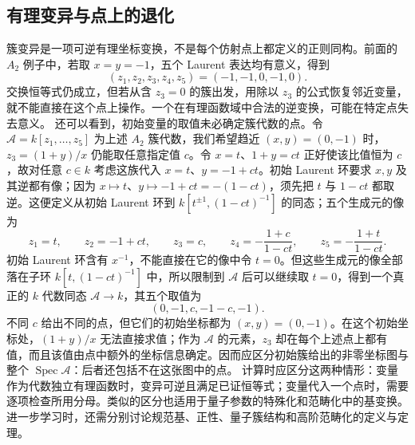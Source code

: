 \subsection{有理变异与点上的退化}
\label{b5:subsec:B04:02}

簇变异是一项可逆有理坐标变换，不是每个仿射点上都定义的正则同构。前面的 \(A_2\) 例子中，若取 \(x=y=-1\)，五个 Laurent 表达均有意义，得到
\[
	(z_1,z_2,z_3,z_4,z_5)=(-1,-1,0,-1,0).
\]
交换恒等式仍成立，但若从含 \(z_3=0\) 的簇出发，用除以 \(z_3\) 的公式恢复邻近变量，就不能直接在这个点上操作。一个在有理函数域中合法的逆变换，可能在特定点失去意义。
\ProseParagraphBreak
还可以看到，初始变量的取值未必确定簇代数的点。令 \(\mathcal A=k[z_1,\ldots,z_5]\) 为上述 \(A_2\) 簇代数，我们希望趋近 \((x,y)=(0,-1)\) 时，\(z_3=(1+y)/x\) 仍能取任意指定值 \(c\)。令 \(x=t\)、\(1+y=ct\) 正好使该比值恒为 \(c\)，故对任意 \(c\in k\) 考虑这族代入 \(x=t\)、\(y=-1+ct\)。初始 Laurent 环要求 \(x,y\) 及其逆都有像；因为 \(x\mapsto t\)、\(y\mapsto-1+ct=-(1-ct)\)，须先把 \(t\) 与 \(1-ct\) 都取逆。这便定义从初始 Laurent 环到 \(k[t^{\pm1},(1-ct)^{-1}]\) 的同态；五个生成元的像为
\[
	z_1=t,\qquad z_2=-1+ct,\qquad z_3=c,\qquad z_4=-\frac{1+c}{1-ct},\qquad z_5=-\frac{1+t}{1-ct}.
\]
初始 Laurent 环含有 \(x^{-1}\)，不能直接在它的像中令 \(t=0\)。但这些生成元的像全部落在子环 \(k[t,(1-ct)^{-1}]\) 中，所以限制到 \(\mathcal A\) 后可以继续取 \(t=0\)，得到一个真正的 \(k\) 代数同态 \(\mathcal A\to k\)，其五个取值为
\[
	(0,-1,c,-1-c,-1).
\]
不同 \(c\) 给出不同的点，但它们的初始坐标都为 \((x,y)=(0,-1)\)。在这个初始坐标处，\((1+y)/x\) 无法直接求值；作为 \(\mathcal A\) 的元素，\(z_3\) 却在每个上述点上都有值，而且该值由点中额外的坐标信息确定。因而应区分初始簇给出的非零坐标图与整个 \(\operatorname{Spec}\mathcal A\)：后者还包括不在这张图中的点。
\ProseParagraphBreak
计算时应区分这两种情形：变量作为代数独立有理函数时，变异可逆且满足已证恒等式；变量代入一个点时，需要逐项检查所用分母。类似的区分也适用于量子参数的特殊化和范畴化中的基变换。进一步学习时，还需分别讨论规范基、正性、量子簇结构和高阶范畴化的定义与定理。

